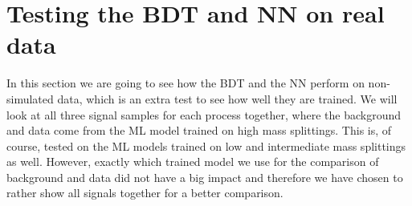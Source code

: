 \section{Testing the BDT and NN on real data}

In this section we are going to see how the BDT and the NN perform on non-simulated data, which is an extra test to see how well they are trained. We will look at all three signal samples for each process together, where the background and data come from the ML model trained on high mass splittings. This is, of course, tested on the ML models trained on low and intermediate mass splittings as well. However, exactly which trained model we use for the comparison of background and data did not have a big impact and therefore we have chosen to rather show all signals together for a better comparison. 

